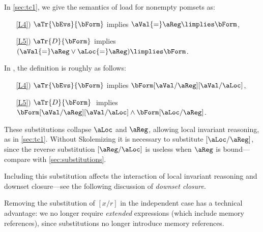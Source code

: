 In \textsection\ref{sec:tc1}, %
we give the semantics of load for nonempty pomsets as:
\begin{enumerate}
\item[\ref{L4})]
  $\aTr{\bEvs}{\bForm}$ implies $\aVal{=}\aReg\limplies\bForm$, 
\item[\ref{L5})]
  $\aTr{\cEvs}{\bForm}$ implies
  $(\aVal{=}\aReg\lor\aLoc{=}\aReg)\limplies\bForm$.
\end{enumerate}
In \jjr{}, the definition is roughly as follows:
\begin{enumerate}
\item[\ref{L4})]
  $\aTr{\bEvs}{\bForm}$ implies $\bForm[\aVal/\aReg][\aVal/\aLoc]$, 
\item[\ref{L5})]
  $\aTr{\cEvs}{\bForm}\;$ implies $\bForm[\aVal/\aReg][\aVal/\aLoc]\land\bForm[\aLoc/\aReg]$.
\end{enumerate}
These substitutions collapse $\aLoc$ and $\aReg$, allowing local invariant
reasoning, as in \textsection\ref{sec:tc1}.  Without Skolemizing it is
necessary to substitute $[\aLoc/\aReg]$, since the reverse substitution
$[\aReg/\aLoc]$ is useless when $\aReg$ is bound---compare with
\textsection\ref{sec:substitutions}.

Including this substitution affects the interaction of local invariant
reasoning and downset closure---see the following discussion of \emph{downset
  closure}.

Removing the substitution of $[x/r]$ in the independent case has a technical
advantage: we no longer require \emph{extended} expressions (which include
memory references), since substitutions no longer introduce memory
references.

